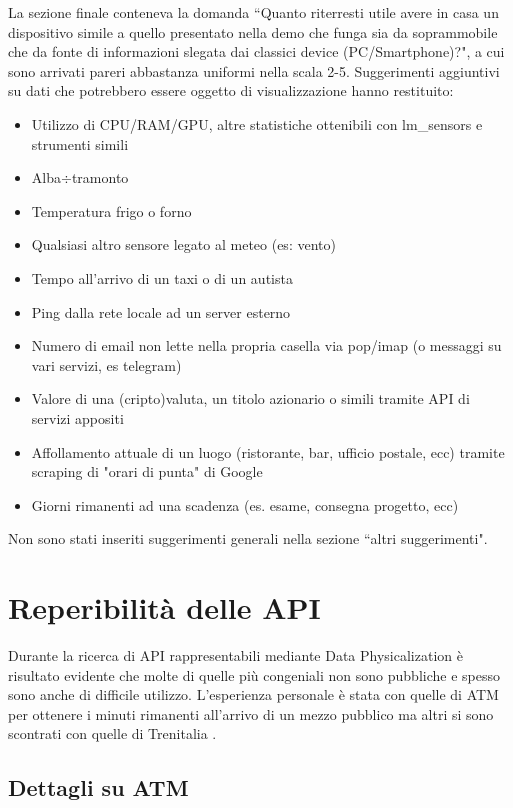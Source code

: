 \documentclass[12pt,a4paper]{report}
\begin{document}
La sezione finale conteneva la domanda ``Quanto riterresti utile avere in casa un dispositivo simile a quello presentato nella demo che
funga sia da soprammobile che da fonte di informazioni slegata dai classici device (PC/Smartphone)?", a cui sono arrivati pareri abbastanza
uniformi nella scala 2-5. Suggerimenti aggiuntivi su dati che potrebbero essere oggetto di visualizzazione hanno restituito:
\begin{itemize}
  \item Utilizzo di CPU/RAM/GPU, altre statistiche ottenibili con lm_sensors e strumenti simili
  \item Alba$\div$tramonto
  \item Temperatura frigo o forno
  \item Qualsiasi altro sensore legato al meteo (es: vento)
  \item Tempo all'arrivo di un taxi o di un autista
  \item Ping dalla rete locale ad un server esterno
  \item Numero di email non lette nella propria casella via pop/imap (o messaggi su vari servizi, es telegram)
  \item Valore di una (cripto)valuta, un titolo azionario o simili tramite API di servizi appositi
  \item Affollamento attuale di un luogo (ristorante, bar, ufficio postale, ecc) tramite scraping di "orari di punta" di Google
  \item Giorni rimanenti ad una scadenza (es. esame, consegna progetto, ecc)
\end{itemize}
Non sono stati inseriti suggerimenti generali nella sezione ``altri suggerimenti".

\section{Reperibilità delle API}
Durante la ricerca di API rappresentabili mediante Data Physicalization è risultato evidente che molte di quelle più congeniali non
sono pubbliche e spesso sono anche di difficile utilizzo. L'esperienza personale è stata con quelle di ATM per ottenere i minuti rimanenti
all'arrivo di un mezzo pubblico ma altri si sono scontrati con quelle di Trenitalia \cite{trenitaliashock}.

\subsection{Dettagli su ATM}
\end{document}
